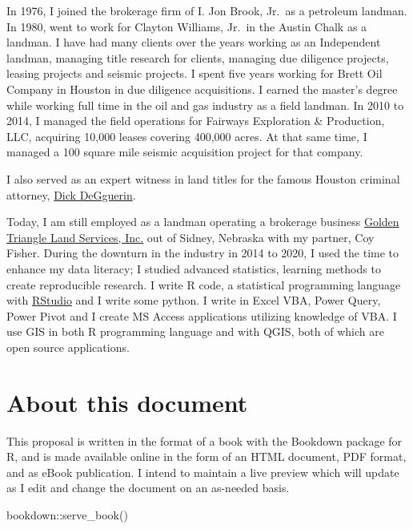 \documentclass[
]{book}
\newenvironment{Shaded}{\begin{snugshade}}{\end{snugshade}}
\newcommand{\FunctionTok}[1]{\textcolor[rgb]{0.00,0.00,0.00}{#1}}
\newcommand{\NormalTok}[1]{#1}
\newcommand{\SpecialCharTok}[1]{\textcolor[rgb]{0.00,0.00,0.00}{#1}}
\begin{document}
In 1976, I joined the brokerage firm of I. Jon Brook, Jr.~as a petroleum landman. In 1980, went to work for Clayton Williams, Jr.~in the Austin Chalk as a landman. I have had many clients over the years working as an Independent landman, managing title research for clients, managing due diligence projects, leasing projects and seismic projects. I spent five years working for Brett Oil Company in Houston in due diligence acquisitions. I earned the master's degree while working full time in the oil and gas industry as a field landman. In 2010 to 2014, I managed the field operations for Fairways Exploration \& Production, LLC, acquiring 10,000 leases covering 400,000 acres. At that same time, I managed a 100 square mile seismic acquisition project for that company.

I also served as an expert witness in land titles for the famous Houston criminal attorney, \href{https://deguerin.com/}{Dick DeGguerin}.

Today, I am still employed as a landman operating a brokerage business \href{https://goldentriangleland.com/}{Golden Triangle Land Services, Inc.} out of Sidney, Nebraska with my partner, Coy Fisher. During the downturn in the industry in 2014 to 2020, I used the time to enhance my data literacy; I studied advanced statistics, learning methods to create reproducible research. I write R code, a statistical programming language with \href{https://www.rstudio.com/about/}{RStudio} and I write some python. I write in Excel VBA, Power Query, Power Pivot and I create MS Access applications utilizing knowledge of VBA. I use GIS in both R programming language and with QGIS, both of which are open source applications.

\hypertarget{about-this-document}{%
\section{About this document}\label{about-this-document}}

This proposal is written in the format of a book with the Bookdown package for R, and is made available online in the form of an HTML document, PDF format, and as eBook publication. I intend to maintain a live preview which will update as I edit and change the document on an as-needed basis.

\begin{Shaded}
\begin{Highlighting}[]
\NormalTok{bookdown}\SpecialCharTok{::}\FunctionTok{serve\_book}\NormalTok{()}
\end{Highlighting}
\end{Shaded}
\end{document}
